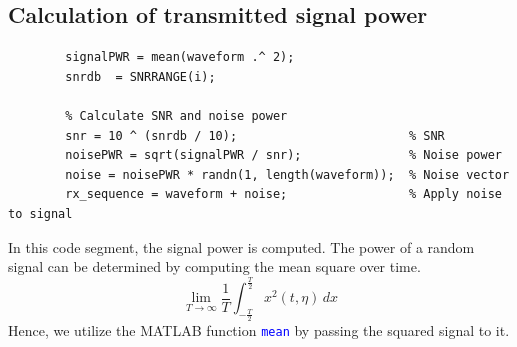 \documentclass[a4paper, 12pt, english]{article}
\newcommand{\highlight}[1]{\textcolor{blue}{\texttt{#1}}}
\begin{document}


\newpage
\subsection{Calculation of transmitted signal power}
\begin{lstlisting}[style=matlab]
        % Calculate the average signal power
        signalPWR = mean(waveform .^ 2);
        snrdb  = SNRRANGE(i);

        % Calculate SNR and noise power
        snr = 10 ^ (snrdb / 10);                        % SNR
        noisePWR = sqrt(signalPWR / snr);               % Noise power
        noise = noisePWR * randn(1, length(waveform));  % Noise vector
        rx_sequence = waveform + noise;                 % Apply noise to signal
\end{lstlisting}
In this code segment, the signal power is computed. The power of a random signal can be determined by computing the mean square over time. \[ \lim_{T\to\infty} \frac{1}{T}\int_{-\frac{T}{2}}^{\frac{T}{2}}{x^2(t,\eta)} \,dx \]
 Hence, we utilize the MATLAB function \highlight{mean} by passing the squared signal to it.
\end{document}
